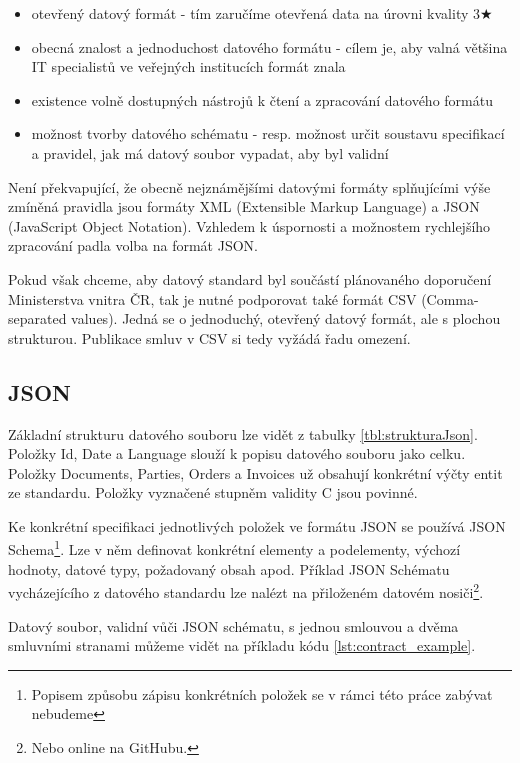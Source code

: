 \begin{itemize}
\item otevřený datový formát - tím zaručíme otevřená data na úrovni kvality 3$\bigstar$
\item obecná znalost a jednoduchost datového formátu - cílem je, aby valná většina IT specialistů ve veřejných institucích formát znala
\item existence volně dostupných nástrojů k čtení a zpracování datového formátu
\item možnost tvorby datového schématu - resp. možnost určit soustavu specifikací a pravidel, jak má datový soubor vypadat, aby byl validní
\end{itemize}

Není překvapující, že obecně nejznámějšími datovými formáty splňujícími výše zmíněná pravidla jsou formáty XML (Extensible Markup Language) a JSON (JavaScript Object Notation)\cite{JSON}. Vzhledem k úspornosti a možnostem rychlejšího zpracování padla volba na formát JSON.

Pokud však chceme, aby datový standard byl součástí plánovaného doporučení Ministerstva vnitra ČR, tak je nutné podporovat také formát CSV (Comma-separated values)\cite{csv}. Jedná se o jednoduchý, otevřený datový formát, ale s plochou strukturou. Publikace smluv v CSV si tedy vyžádá řadu omezení. \cite{opendatametodika, howtoopendata}

\subsection{JSON}

Základní strukturu datového souboru lze vidět z tabulky \ref{tbl:strukturaJson}. Položky Id, Date a Language slouží k popisu datového souboru jako celku. Položky Documents, Parties, Orders a Invoices už obsahují konkrétní výčty entit ze standardu. Položky vyznačené stupněm validity C jsou povinné.

Ke konkrétní specifikaci jednotlivých položek ve formátu JSON se používá JSON Schema\cite{JSONSchema}\footnote{Popisem způsobu zápisu konkrétních položek se v rámci této práce zabývat nebudeme}. Lze v něm definovat konkrétní elementy a podelementy, výchozí hodnoty, datové typy, požadovaný obsah apod. Příklad JSON Schématu vycházejícího z datového standardu lze nalézt na přiloženém datovém nosiči\footnote{Nebo online na GitHubu\cite{contractschema}.}.

Datový soubor, validní vůči JSON schématu, s jednou smlouvou a dvěma smluvními stranami můžeme vidět na příkladu kódu \ref{lst:contract_example}.

